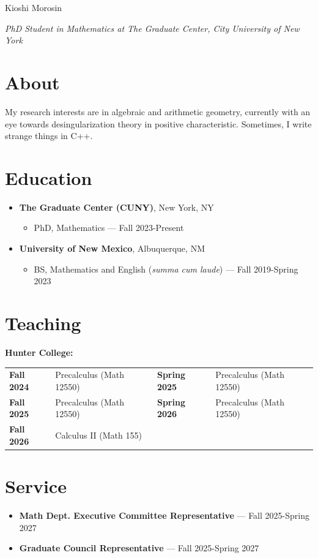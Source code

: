 \documentclass[10pt]{article}
\begin{document}
{\huge Kioshi Morosin}

\textit{PhD Student in Mathematics at The Graduate Center, City University of New York}

\section*{About}
My research interests are in algebraic and arithmetic geometry, currently with an eye towards desingularization theory in positive characteristic. Sometimes, I write strange things in C++.

\section*{Education}
\begin{itemize}
    \item \textbf{The Graduate Center (CUNY)}, New York, NY
    \begin{itemize}
        \item[] PhD, Mathematics --- Fall 2023-Present
    \end{itemize}
    \item \textbf{University of New Mexico}, Albuquerque, NM
    \begin{itemize}
        \item[] BS, Mathematics and English (\textit{summa cum laude}) --- Fall 2019-Spring 2023
    \end{itemize}
\end{itemize}

\section*{Teaching}
\textbf{Hunter College:}

\begin{tabular}{llll}
    \textbf{Fall 2024} & Precalculus (Math 12550) & \textbf{Spring 2025} & Precalculus (Math 12550)\\
    \textbf{Fall 2025} & Precalculus (Math 12550) & \textbf{Spring 2026} & Precalculus (Math 12550)\\ 
    \textbf{Fall 2026} & Calculus II (Math 155)
\end{tabular}

\section*{Service}
\begin{itemize}
    \item \textbf{Math Dept. Executive Committee Representative} --- Fall 2025-Spring 2027
    \item \textbf{Graduate Council Representative} --- Fall 2025-Spring 2027
\end{itemize}
\end{document}
